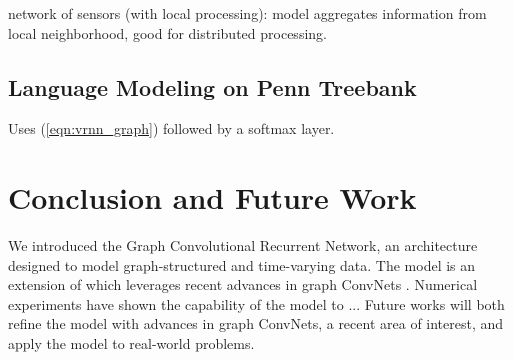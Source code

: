 \documentclass{article} %
\newcommand{\eqnref}[1]{(\ref{eqn:#1})}
\newcommand{\todo}[1]{{\color{red} #1 }}
\begin{document}
network of sensors (with local processing):
model aggregates information from local neighborhood, good for distributed processing.

\subsection{Language Modeling on Penn Treebank}

Uses \eqnref{vrnn_graph} followed by a softmax layer.

\section{Conclusion and Future Work}

We introduced the Graph Convolutional Recurrent Network, an architecture
designed to model graph-structured and time-varying data. The model is an
extension of \citet{convlstm} which leverages recent advances in graph ConvNets
\citep{graphcnn}. Numerical experiments have shown the capability of the model
\todo{to ...}
Future works will both refine the model with advances in graph ConvNets, a recent area of interest, and apply the model to real-world problems.


\newpage


\end{document}
